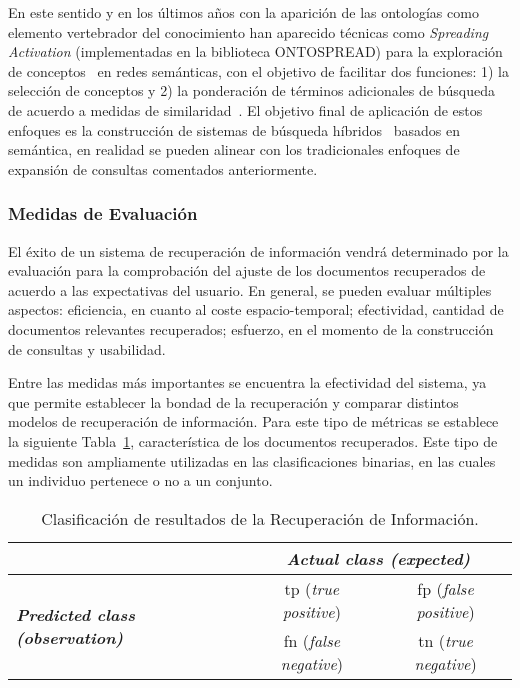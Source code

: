 En este sentido y en los últimos años con la aparición de las ontologías como elemento 
vertebrador del conocimiento han aparecido técnicas como \textit{Spreading Activation} (implementadas en la biblioteca ONTOSPREAD) 
para la exploración de conceptos~\cite{Qiu93,Chen95} en redes semánticas, 
con el objetivo de facilitar dos funciones: 1) la selección de conceptos y 2) la ponderación de términos 
adicionales de búsqueda de acuerdo a medidas de similaridad~\cite{gouws-vanrooyen-engelbrecht:2010:CCSR}. El objetivo 
final de aplicación de estos enfoques es la construcción de sistemas de búsqueda 
híbridos~\cite{bopaEstonia,RochaSA04,conf-sofsem-Suchal08,767402} basados en semántica, en realidad se pueden alinear 
con los tradicionales enfoques de expansión de consultas comentados anteriormente.

\subsubsection{Medidas de Evaluación}
El éxito de un sistema de recuperación de información vendrá 
determinado por la evaluación para la comprobación del ajuste 
de los documentos recuperados de acuerdo a las expectativas del usuario. En general, 
se pueden evaluar múltiples aspectos: eficiencia, en cuanto al coste 
espacio-temporal; efectividad, cantidad de documentos relevantes recuperados; 
esfuerzo, en el momento de la construcción de consultas y usabilidad. 

Entre las medidas más importantes se encuentra la efectividad del sistema, ya que 
permite establecer la bondad de la recuperación y comparar distintos modelos 
de recuperación de información. Para este tipo de métricas se establece la siguiente 
Tabla~\ref{tabla:pr}, característica de los documentos recuperados. Este tipo de medidas 
son ampliamente utilizadas en las clasificaciones binarias, en las cuales un individuo 
pertenece o no a un conjunto.

\begin{table}[!htb]
\renewcommand{\arraystretch}{1.3}
\begin{center}
\begin{tabular}{|l|c|c|}
\hline
  &\multicolumn{2}{|c|}{\textbf{\textit{Actual class (expected)}}} \\ \hline
   \multirow{2}{*}{\textbf{\textit{Predicted class (observation)}}}&tp (\textit{true positive})&fp (\textit{false positive}) \\ 
  &fn (\textit{false negative})&tn (\textit{true negative}) \\ \hline
  \hline
  \end{tabular}
  \caption{Clasificación de resultados de la Recuperación de Información.}
  \label{tabla:pr}
  \end{center}
\end{table} 


